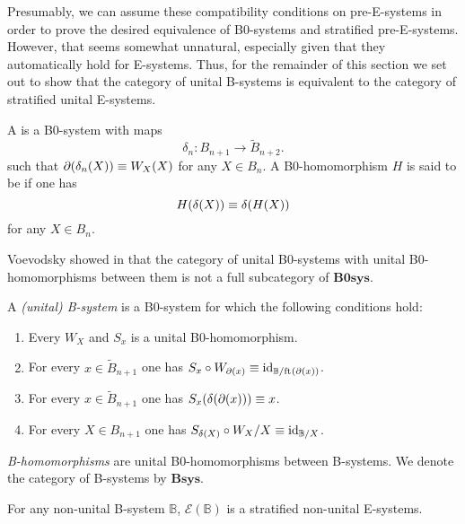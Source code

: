 Presumably, we can assume these compatibility conditions on pre-E-systems in order
to prove the desired equivalence of B0-systems and stratified pre-E-systems. However,
that seems somewhat unnatural, especially given that they automatically hold
for E-systems. Thus, for the remainder of this section we set out to show that
the category of unital B-systems is equivalent to the category of stratified 
unital E-systems.

\begin{defn}
A  is a B0-system with maps
\begin{equation*}
\delta_n : B_{n+1}\to \tilde{B}_{n+2}.
\end{equation*}
such that $\partial_{}(\delta_n(X))\equiv W_{X}(X)$ for any $X\in B_n$. 
A B0-homomorphism $H$ is said to be  if one has
\begin{equation*}
H(\delta(X))\equiv\delta(H(X))
\end{equation*}
for any $X\in B_n$.  
\end{defn}

\begin{rmk}
Voevodsky showed in \cite{VV_B-systems} that the category of unital B0-systems
with unital B0-homomorphisms between them is not a full
subcategory of $\mathbf{B0sys}$. 
\end{rmk}

\begin{defn}
A \emph{(unital) B-system} is a B0-system for which the following conditions
hold:
\begin{enumerate}
\item Every $W_X$ and $S_x$ is a unital B0-homomorphism.
\item For every $x\in \tilde{B}_{n+1}$ one has $S_x\circ W_{\partial_{}(x)}\equiv
{\mathrm{id}_{\mathbb{B}/\mathrm{ft}_{}(\partial_{}(x))}}$. 
\item For every $x\in\tilde{B}_{n+1}$ one has $S_x(\delta(\partial_{}(x)))\equiv x$.
\item For every $X\in B_{n+1}$ one has $S_{\delta(X)}\circ W_X/X\equiv
{\mathrm{id}_{\mathbb{B}/X}}$. 
\end{enumerate}
\emph{B-homomorphisms} are unital B0-homomorphisms between B-systems.
We denote the category of B-systems by $\mathbf{Bsys}$. 
\end{defn}

\begin{lem}
For any non-unital B-system $\mathbb{B}$, $\mathcal{E}(\mathbb{B})$ is a 
stratified non-unital E-systems. 
\end{lem}

